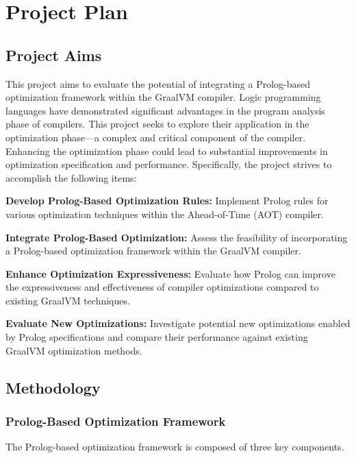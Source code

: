 \chapter[Project Plan]{Project Plan}

\section{Project Aims}
This project aims to evaluate the potential of integrating a Prolog-based optimization framework within the GraalVM compiler. Logic programming languages have demonstrated significant advantages in the program analysis phase of compilers. This project seeks to explore their application in the optimization phase—a complex and critical component of the compiler. Enhancing the optimization phase could lead to substantial improvements in optimization specification and performance. Specifically, the project strives to accomplish the following items:
\begin{description}
    \item \textbf{Develop Prolog-Based Optimization Rules:} Implement Prolog rules for various optimization techniques within the Ahead-of-Time (AOT) compiler.
    \item \textbf{Integrate Prolog-Based Optimization:} Assess the feasibility of incorporating a Prolog-based optimization framework within the GraalVM compiler.
    \item \textbf{Enhance Optimization Expressiveness:} Evaluate how Prolog can improve the expressiveness and effectiveness of compiler optimizations compared to existing GraalVM techniques.
    \item \textbf{Evaluate New Optimizations:} Investigate potential new optimizations enabled by Prolog specifications and compare their performance against existing GraalVM optimization methods.
\end{description}

\setcounter{secnumdepth}{3}

\section{Methodology}

\subsection{Prolog-Based Optimization Framework}
The Prolog-based optimization framework is composed of three key components. 

